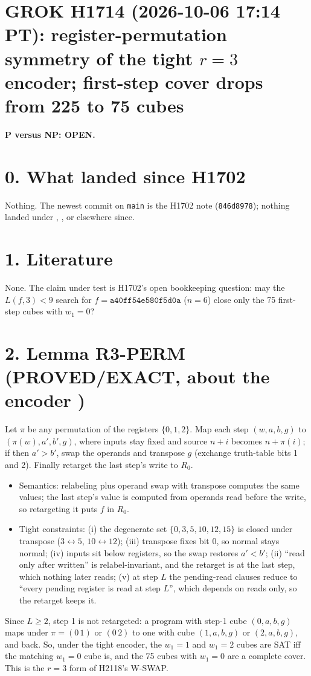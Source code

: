 \documentclass[11pt]{article}
\begin{document}
\sloppy
\section*{GROK H1714 (2026-10-06 17:14 PT): register-permutation symmetry of the tight $r=3$ encoder; first-step cover drops from 225 to 75 cubes}
\textbf{P versus NP: OPEN.}

\section*{0. What landed since H1702}
Nothing. The newest commit on \texttt{main} is the H1702 note (\texttt{846d8978}); nothing landed under , , or elsewhere since.

\section*{1. Literature}
None. The claim under test is H1702's open bookkeeping question: may the $L(f,3)<9$ search for $f=\texttt{a40ff54e580f5d0a}$ ($n=6$) close only the 75 first-step cubes with $w_1=0$?

\section*{2. Lemma R3-PERM (PROVED/EXACT, about the encoder )}
Let $\pi$ be any permutation of the registers $\{0,1,2\}$. Map each step $(w,a,b,g)$ to $(\pi(w),a',b',g)$, where inputs stay fixed and source $n+i$ becomes $n+\pi(i)$; if then $a'>b'$, swap the operands and transpose $g$ (exchange truth-table bits 1 and 2). Finally retarget the last step's write to $R_0$.
\begin{itemize}
\item Semantics: relabeling plus operand swap with transpose computes the same values; the last step's value is computed from operands read before the write, so retargeting it puts $f$ in $R_0$.
\item Tight constraints: (i) the degenerate set $\{0,3,5,10,12,15\}$ is closed under transpose ($3\leftrightarrow5$, $10\leftrightarrow12$); (iii) transpose fixes bit 0, so normal stays normal; (iv) inputs sit below registers, so the swap restores $a'<b'$; (ii) ``read only after written'' is relabel-invariant, and the retarget is at the last step, which nothing later reads; (v) at step $L$ the pending-read clauses reduce to ``every pending register is read at step $L$'', which depends on reads only, so the retarget keeps it.
\end{itemize}
Since $L\ge 2$, step 1 is not retargeted: a program with step-1 cube $(0,a,b,g)$ maps under $\pi=(0\,1)$ or $(0\,2)$ to one with cube $(1,a,b,g)$ or $(2,a,b,g)$, and back. So, under the tight encoder, the $w_1=1$ and $w_1=2$ cubes are SAT iff the matching $w_1=0$ cube is, and the 75 cubes with $w_1=0$ are a complete cover. This is the $r=3$ form of H2118's W-SWAP.
\end{document}
